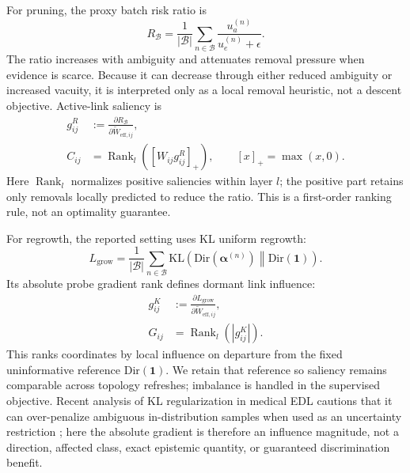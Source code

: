 \documentclass[letterpaper]{article}
\newcommand{\Dir}{\text{Dir}}
\newcommand{\KL}{\text{KL}}
\begin{document}
For pruning, the proxy batch risk ratio is
\begin{equation}\label{eq:batch_risk}
    R_{\mathcal{B}}
    =
    \frac{1}{|\mathcal{B}|}
    \sum_{n\in\mathcal{B}}
    \frac{u_a^{(n)}}{u_e^{(n)}+\epsilon}.
\end{equation}
The ratio increases with ambiguity and attenuates removal pressure when evidence is scarce. Because it can decrease through either reduced ambiguity or increased vacuity, it is interpreted only as a local removal heuristic, not a descent objective. Active-link saliency is
\begin{equation}\label{eq:C_ij}
\begin{aligned}
    g^R_{ij}
    &:=\frac{\partial R_{\mathcal B}}
    {\partial\widetilde W_{\mathrm{eff},ij}},\\
    C_{ij}&=\operatorname{Rank}_{l}
    \!\left([W_{ij}g^R_{ij}]_+\right),
    \qquad [x]_+=\max(x,0).
\end{aligned}
\end{equation}
Here $\operatorname{Rank}_{l}$ normalizes positive saliencies within layer $l$; the positive part retains only removals locally predicted to reduce the ratio. This is a first-order ranking rule, not an optimality guarantee.

For regrowth, the reported setting uses KL uniform regrowth:
\begin{equation}\label{eq:grow_objective}
    L_{\text{grow}}
    =
    \frac{1}{|\mathcal{B}|}\sum_{n\in\mathcal{B}}
    \KL\!\left(
    \Dir(\bm{\alpha}^{(n)})\middle\|\Dir(\mathbf{1})
    \right).
\end{equation}
Its absolute probe gradient rank defines dormant link influence:
\begin{equation}\label{eq:G_ij}
\begin{aligned}
    g^K_{ij}
    &:=\frac{\partial L_{\mathrm{grow}}}
    {\partial\widetilde W_{\mathrm{eff},ij}},\\
    G_{ij}&=\operatorname{Rank}_{l}\!\left(|g^K_{ij}|\right).
\end{aligned}
\end{equation}
This ranks coordinates by local influence on departure from the fixed uninformative reference $\Dir(\mathbf1)$. We retain that reference so saliency remains comparable across topology refreshes; imbalance is handled in the supervised objective. Recent analysis of KL regularization in medical EDL cautions that it can over-penalize ambiguous in-distribution samples when used as an uncertainty restriction \cite{fu2026dedl}; here the absolute gradient is therefore an influence magnitude, not a direction, affected class, exact epistemic quantity, or guaranteed discrimination benefit.
\end{document}
